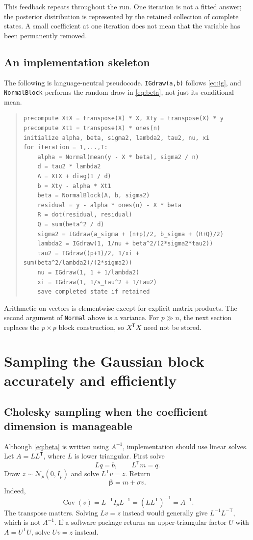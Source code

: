 \documentclass[11pt,letterpaper]{article}
\numberwithin{equation}{section}
\newcommand{\Cov}{\operatorname{Cov}}
\newcommand{\Normal}{\mathcal{N}}
\newcommand{\bbeta}{\bm{\beta}}
\newcommand{\trans}{^{\mathsf T}}
\begin{document}
This feedback repeats throughout the run. One iteration is not a fitted
answer; the posterior distribution is represented by the retained collection
of complete states. A small coefficient at one iteration does not mean that
the variable has been permanently removed.

\subsection{An implementation skeleton}

The following is language-neutral pseudocode. \texttt{IGdraw(a,b)} follows
\eqref{eq:ig}, and \texttt{NormalBlock} performs the random draw in
\eqref{eq:beta}, not just its conditional mean.
\begin{quote}\small
\begin{verbatim}
precompute XtX = transpose(X) * X, Xty = transpose(X) * y
precompute Xt1 = transpose(X) * ones(n)
initialize alpha, beta, sigma2, lambda2, tau2, nu, xi
for iteration = 1,...,T:
    alpha = Normal(mean(y - X * beta), sigma2 / n)
    d = tau2 * lambda2
    A = XtX + diag(1 / d)
    b = Xty - alpha * Xt1
    beta = NormalBlock(A, b, sigma2)
    residual = y - alpha * ones(n) - X * beta
    R = dot(residual, residual)
    Q = sum(beta^2 / d)
    sigma2 = IGdraw(a_sigma + (n+p)/2, b_sigma + (R+Q)/2)
    lambda2 = IGdraw(1, 1/nu + beta^2/(2*sigma2*tau2))
    tau2 = IGdraw((p+1)/2, 1/xi + sum(beta^2/lambda2)/(2*sigma2))
    nu = IGdraw(1, 1 + 1/lambda2)
    xi = IGdraw(1, 1/s_tau^2 + 1/tau2)
    save completed state if retained
\end{verbatim}
\end{quote}
Arithmetic on vectors is elementwise except for explicit matrix products.
The second argument of \texttt{Normal} above is a variance. For \(p\gg n\),
the next section replaces the \(p\times p\) block construction, so
\(X\trans X\) need not be stored.

\section{Sampling the Gaussian block accurately and efficiently}\label{sec:linearalgebra}

\subsection{Cholesky sampling when the coefficient dimension is manageable}

Although \eqref{eq:beta} is written using \(A^{-1}\), implementation should
use linear solves. Let \(A=LL\trans\), where \(L\) is lower triangular.
First solve
\[
 Lq=b,\qquad L\trans m=q.
\]
Draw \(z\sim\Normal_p(0,I_p)\) and solve \(L\trans v=z\). Return
\begin{equation}\label{eq:choldraw}
 \bbeta=m+\sigma v.
\end{equation}
Indeed,
\[
 \Cov(v)=L^{-\mathsf T}I_pL^{-1}=(LL\trans)^{-1}=A^{-1}.
\]
The transpose matters. Solving \(Lv=z\) instead would generally give
\(L^{-1}L^{-\mathsf T}\), which is not \(A^{-1}\). If a software package
returns an upper-triangular factor \(U\) with \(A=U\trans U\), solve
\(Uv=z\) instead.
\end{document}
